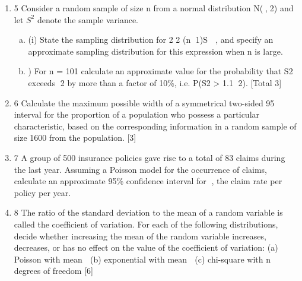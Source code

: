 \documentclass[a4paper,12pt]{article}
\begin{document}
\begin{enumerate}
\item 5 Consider a random sample of size n from a normal distribution N(,2) and let $S^2$
denote the sample variance.
\begin{enumerate}[(a)]
    \item (i) State the sampling distribution for
2
2
(n 1)S

, and specify an approximate
sampling distribution for this expression when n is large. 
    \item ) For n = 101 calculate an approximate value for the probability that S2 exceeds
2 by more than a factor of 10\%, i.e. P(S2 > 1.1 2). 
[Total 3]
\end{enumerate}


\item 6 Calculate the maximum possible width of a symmetrical two-sided 95%
interval for the proportion of a population who possess a particular characteristic,
based on the corresponding information in a random sample of size 1600 from the
population. [3]
\item 7 A group of 500 insurance policies gave rise to a total of 83 claims during the last year.
Assuming a Poisson model for the occurrence of claims, calculate an approximate
95\% confidence interval for , the claim rate per policy per year. 

\item 8 The ratio of the standard deviation to the mean of a random variable is called the
coefficient of variation.
For each of the following distributions, decide whether increasing the mean of the
random variable increases, decreases, or has no effect on the value of the coefficient
of variation:
(a) Poisson with mean 
(b) exponential with mean 
(c) chi-square with n degrees of freedom [6]
\end{enumerate}

\newpage
\end{document}
